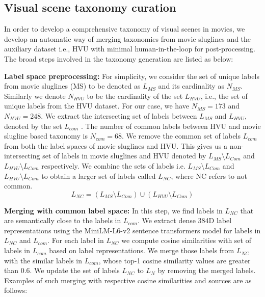 \subsection{Visual scene taxonomy curation}
In order to develop a comprehensive taxonomy of visual scenes in movies, we develop an automatic way of merging taxonomies from movie sluglines and the auxiliary dataset i.e., HVU with minimal human-in-the-loop for post-processing. The broad steps involved in the taxonomy generation are listed as below:
\par
\textbf{Label space preprocessing:} For simplicity, we consider the set of unique labels from movie sluglines (MS) to be denoted as $L_{MS}$ and its cardinality as $N_{MS}$. Similarly we denote $N_{HVU}$ to be the cardinality of the set $L_{HVU}$, i.e., the set of unique labels from the HVU dataset. For our case, we have $N_{MS}=173$ and $N_{HVU}=248$. We extract the intersecting set of labels between $L_{MS}$ and $L_{HVU}$, denoted by the set $L_{com}$ . The number of common labels between HVU and movie slugline based taxonomy is $N_{com}=68$. We remove the common set of labels $L_{com}$ from both the label spaces of movie sluglines and HVU. This gives us a non-intersecting set of labels in movie sluglines and HVU denoted by $L_{MS} \setminus L_{Com}$  and $L_{HVU} \setminus L_{Com}$ respectively.  We combine the sets of labels i.e. $L_{MS} \setminus L_{Com}$ and $L_{HVU} \setminus L_{Com}$ to obtain a larger set of labels called $L_{NC}$, where NC refers to not common. 
\begin{equation}
    L_{NC}=(L_{MS} \setminus L_{Com}) \cup (L_{HVU} \setminus L_{Com})
\end{equation}
\par 
\textbf{Merging with common label space:}
In this step, we find labels in $L_{NC}$ that are semantically close to the labels in $L_{com}$. We extract dense 384D label representations using the MiniLM-L6-v2 sentence transformers model \cite{reimers-2019-sentence-bert} for labels in $L_{NC}$ and $L_{com}$. For each label in $L_{NC}$ we compute cosine similarities with set of labels in $L_{com}$ based on label representations. We merge those labels from $L_{NC}$ with the similar labels in $L_{com}$, whose top-1 cosine similarity values are greater than 0.6. We update the set of labels $L_{NC}$ to $L_{N}$ by removing the merged labels.
Examples of such merging with respective cosine similarities and sources are as follows:
